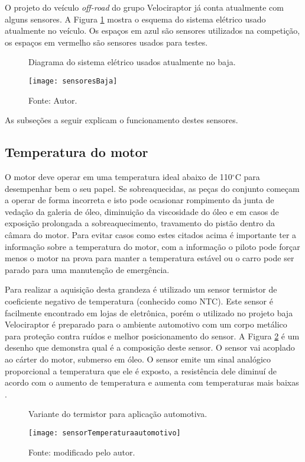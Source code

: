 O projeto do veículo \textit{off-road} do grupo Velociraptor já conta atualmente com alguns sensores. A Figura \ref{fig:sensoresBaja} mostra o esquema do sistema elétrico usado atualmente no veículo. Os espaços em azul são sensores utilizados na competição, os espaços em vermelho são sensores usados para testes. 

\begin{figure}[!htb]
	\centering
		\caption{Diagrama do sistema elétrico usados atualmente no baja.}
		\texttt{[image: sensoresBaja]} 
		\caption*{Fonte: Autor.}
		\label{fig:sensoresBaja}
\end{figure} 

As subseções a seguir explicam o funcionamento destes sensores.

\subsection{Temperatura do motor}

O motor deve operar em uma temperatura ideal abaixo de 110$^\circ$C para desempenhar bem o seu papel. Se sobreaquecidas, as peças do conjunto começam a operar de forma incorreta e isto pode ocasionar rompimento da junta de vedação da galeria de óleo, diminuição da viscosidade do óleo e em casos de exposição prolongada a sobreaquecimento, travamento do pistão dentro da câmara do motor. Para evitar casos como estes citados acima é importante ter a informação sobre a temperatura do motor, com a informação o piloto pode forçar menos o motor na prova para manter a temperatura estável ou o carro pode ser parado para uma manutenção de emergência.

Para realizar a aquisição desta grandeza é utilizado um sensor termistor de coeficiente negativo de temperatura (conhecido como NTC). Este sensor é facilmente encontrado em lojas de eletrônica, porém o utilizado no projeto baja Velociraptor é preparado para o ambiente automotivo com um corpo metálico para proteção contra ruídos e melhor posicionamento do sensor. A Figura \ref{fig:sensorTemperaturaautomotivo} é um desenho que demonstra qual é a composição deste sensor. O sensor vai acoplado ao cárter do motor, submerso em óleo. O sensor emite um sinal analógico proporcional a temperatura que ele é exposto, a resistência dele diminuí de acordo com o aumento de temperatura e aumenta com temperaturas mais baixas \cite{Fraden2016}.  

\begin{figure}[!htb]
	\centering
		\caption{Variante do termistor para aplicação automotiva.}
		\texttt{[image: sensorTemperaturaautomotivo]} 
		\caption*{Fonte:\cite{sensortempauto} modificado pelo autor.}
		\label{fig:sensorTemperaturaautomotivo}
\end{figure} 



